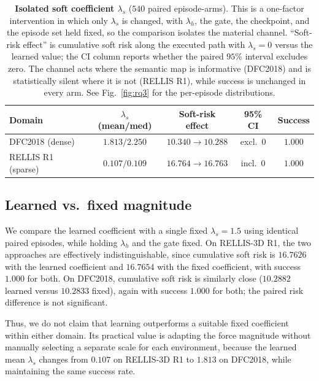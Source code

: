 \begin{table}[htbp]
\centering
\caption{\textbf{Isolated soft coefficient $\lambda_s$} ($540$ paired
episode-arms). This is a one-factor intervention in which only $\lambda_s$ is changed, with
$\lambda_h$, the gate, the checkpoint, and the episode set held fixed, so the
comparison isolates the material channel. ``Soft-risk effect'' is cumulative
soft risk along the executed path with $\lambda_s{=}0$ versus the learned
value; the CI column reports whether the paired $95\%$ interval excludes zero.
The channel acts where the semantic map is informative (DFC2018) and is
statistically silent where it is not (RELLIS R1), while success is unchanged in
every arm. See Fig.~\ref{fig:rq3} for the per-episode distributions.}
\label{tab:app_onefactor}
\small\setlength{\tabcolsep}{6pt}\renewcommand{\arraystretch}{1.1}
\begin{tabular}{lcccc}
\toprule
Domain & $\lambda_s$ (mean/med) & Soft-risk effect & 95\% CI & Success \\
\midrule
DFC2018 (dense)    & $1.813/2.250$ & $10.340\!\to\!10.288$ & excl.\ 0 & $1.000$ \\
RELLIS R1 (sparse) & $0.107/0.109$ & $16.764\!\to\!16.763$ & incl.\ 0 & $1.000$ \\
\bottomrule
\end{tabular}
\end{table}

\subsection{Learned vs.\ fixed magnitude}
\label{app:learned_vs_fixed}

We compare the learned coefficient with a single fixed
$\lambda_s=1.5$ using identical paired episodes, while holding $\lambda_h$ and
the gate fixed. On RELLIS-3D R1, the two approaches are effectively
indistinguishable, since cumulative soft risk is $16.7626$ with the learned
coefficient and $16.7654$ with the fixed coefficient, with success $1.000$ for
both. On DFC2018, cumulative soft risk is similarly close
($10.2882$ learned versus $10.2833$ fixed), again with success $1.000$ for
both; the paired risk difference is not significant.

Thus, we do not claim that learning outperforms a suitable fixed coefficient
within either domain. Its practical value is adapting the force magnitude
without manually selecting a separate scale for each environment, because the learned
mean $\lambda_s$ changes from $0.107$ on RELLIS-3D R1 to $1.813$ on DFC2018,
while maintaining the same success rate.

